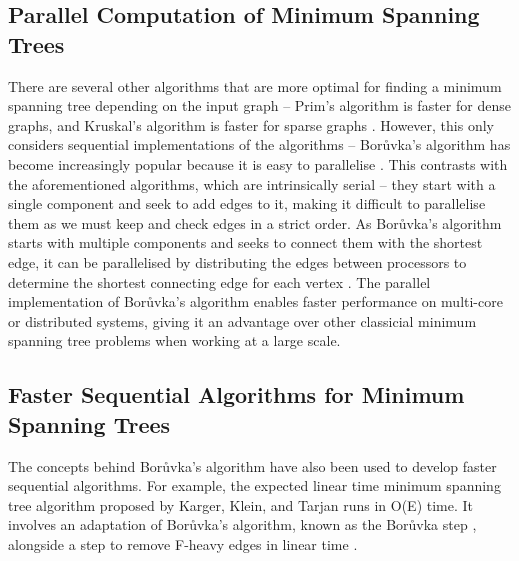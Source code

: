 \documentclass[a4paper, 11pt]{article}
\begin{document}
\newpage
\subsection{Parallel Computation of Minimum Spanning Trees}
There are several other algorithms that are more optimal for finding a minimum spanning tree depending on the input graph -- Prim's algorithm is faster for dense graphs, and Kruskal's algorithm is faster for sparse graphs \cite{bazlamaccci2001minimum}. However, this only considers sequential implementations of the algorithms -- Borůvka's algorithm has become increasingly popular because it is easy to parallelise \cite{mariano2015generic}. This contrasts with the aforementioned algorithms, which are intrinsically serial -- they start with a single component and seek to add edges to it, making it difficult to parallelise them as we must keep and check edges in a strict order. As Borůvka's algorithm starts with multiple components and seeks to connect them with the shortest edge, it can be parallelised by distributing the edges between processors to determine the shortest connecting edge for each vertex \cite{chung1996parallel}. The parallel implementation of Borůvka's algorithm enables faster performance on multi-core or distributed systems, giving it an advantage over other classicial minimum spanning tree problems when working at a large scale.

\subsection{Faster Sequential Algorithms for Minimum Spanning Trees}
The concepts behind Borůvka's algorithm have also been used to develop faster sequential algorithms. For example, the expected linear time minimum spanning tree algorithm proposed by Karger, Klein, and Tarjan runs in O(E) time. It involves an adaptation of Borůvka's algorithm, known as the Borůvka step \cite{dixon1992verification, king1995simpler}, alongside a step to remove F-heavy edges in linear time \cite{karger1995randomized}.

\newpage


\end{document}
